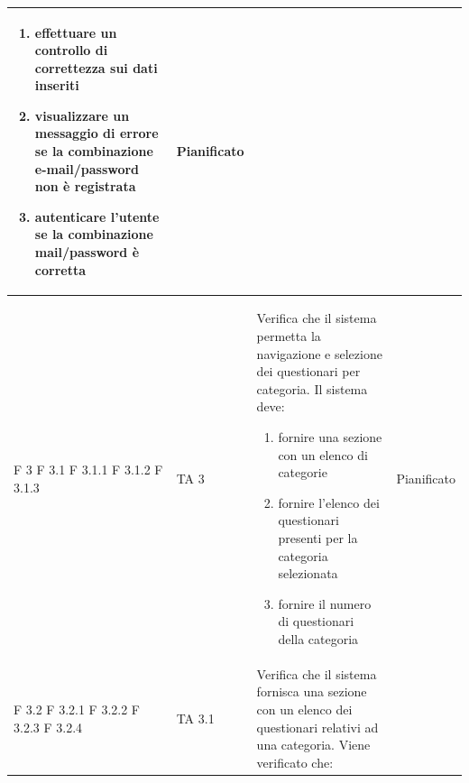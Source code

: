 \documentclass[a4paper,11pt]{article}
\begin{document}
\begin{longtable}{p{}p{}p{}p{}}
\begin{enumerate}
\item effettuare un controllo di correttezza sui dati inseriti
\item visualizzare un messaggio di errore se la combinazione e-mail/password non è registrata
\item autenticare l'utente se la combinazione mail/password è corretta
\end{enumerate} & Pianificato\\
\midrule
F 3 \newline F 3.1 \newline  F 3.1.1 \newline  F 3.1.2 \newline F 3.1.3& TA 3 &Verifica che il sistema permetta la navigazione e selezione dei questionari per categoria. Il sistema deve: 
\begin{enumerate}
\item fornire una sezione con un elenco di categorie
\item fornire l'elenco dei questionari presenti per la categoria selezionata
\item fornire il numero di questionari della categoria
\end{enumerate} & Pianificato\\
\midrule
F 3.2 \newline F 3.2.1 \newline  F 3.2.2 \newline  F 3.2.3 \newline F 3.2.4& TA 3.1 &Verifica che il sistema fornisca una sezione con un elenco dei questionari relativi ad una categoria. Viene verificato che: 

\end{longtable}
\end{document}
